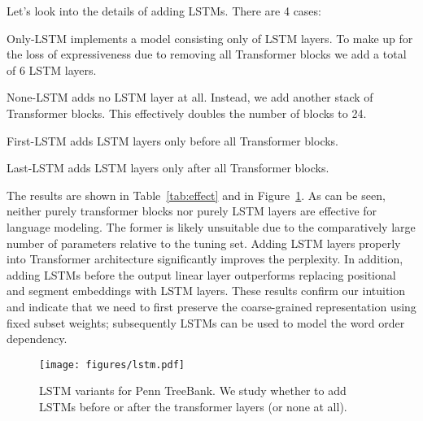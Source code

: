 \documentclass[11pt,a4paper]{article}
\begin{document}
Let's look into the details of adding LSTMs. There are 4 cases:
\begin{description*}
\item [Only-LSTM] implements a model consisting only of LSTM
  layers. To make up for the loss of expressiveness due to removing
  all Transformer blocks we add a total of 6 LSTM layers. 
\item [None-LSTM] adds no LSTM layer at all. Instead, we add another
  stack of Transformer blocks. This effectively doubles the number of
  blocks to 24.
\item [First-LSTM] adds LSTM layers only before all Transformer blocks. 
\item [Last-LSTM] adds LSTM layers only after all Transformer blocks. 
\end{description*}
The results are shown in Table~\ref{tab:effect} and in
Figure~\ref{fig:lstm}. As can be seen, neither purely transformer
blocks nor purely LSTM layers are effective for language modeling. The
former is likely unsuitable due to the comparatively large number of
parameters relative to the tuning set. Adding LSTM layers properly
into Transformer architecture significantly improves the
perplexity. In addition, adding LSTMs before the output linear layer
outperforms replacing positional and segment embeddings with LSTM
layers. These results confirm our intuition and indicate that we need
to first preserve the coarse-grained representation using fixed subset
weights; subsequently LSTMs can be used to model the word order
dependency.


\begin{figure}[tb]
    \centering
    \texttt{[image: figures/lstm.pdf]}
    \caption{LSTM variants for Penn TreeBank. We study whether to add
      LSTMs before or after the transformer layers (or none at all).
      \label{fig:lstm}}
\end{figure}
\end{document}
